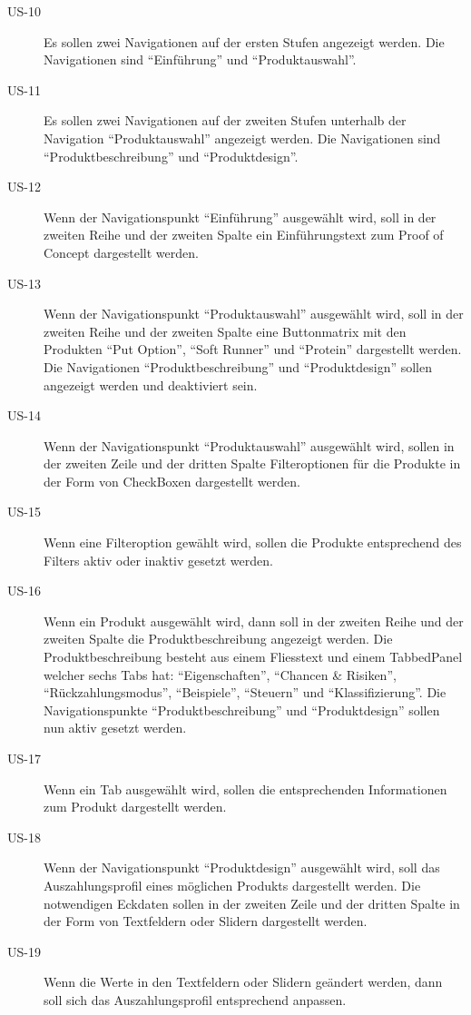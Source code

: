 \begin{description}
\item[US-10\label{itm:US-10}]
Es sollen zwei Navigationen auf der ersten Stufen angezeigt werden. Die
Navigationen sind ``Einführung'' und ``Produktauswahl''.

\item[US-11\label{itm:US-11}]
Es sollen zwei Navigationen auf der zweiten Stufen unterhalb der Navigation
``Produktauswahl'' angezeigt werden. Die Navigationen sind
``Produktbeschreibung'' und ``Produktdesign''.

\item[US-12\label{itm:US-12}]
Wenn der Navigationspunkt ``Einführung'' ausgewählt wird, soll in der zweiten
Reihe und der zweiten Spalte ein Einführungstext zum Proof of Concept
dargestellt werden.

\item[US-13\label{itm:US-13}]
Wenn der Navigationspunkt ``Produktauswahl'' ausgewählt wird, soll in der
zweiten Reihe und der zweiten Spalte eine Buttonmatrix mit den Produkten
``Put Option'', ``Soft Runner'' und ``Protein'' dargestellt werden. Die
Navigationen ``Produktbeschreibung'' und ``Produktdesign'' sollen angezeigt
werden und deaktiviert sein.

\item[US-14\label{itm:US-14}]
Wenn der Navigationspunkt ``Produktauswahl'' ausgewählt wird, sollen in der
zweiten Zeile und der dritten Spalte Filteroptionen für die Produkte in der Form
von CheckBoxen dargestellt werden.

\item[US-15\label{itm:US-15}]
Wenn eine Filteroption gewählt wird, sollen die Produkte entsprechend des
Filters aktiv oder inaktiv gesetzt werden.

\item[US-16\label{itm:US-16}]
Wenn ein Produkt ausgewählt wird, dann soll in der zweiten Reihe und der zweiten
Spalte die Produktbeschreibung angezeigt werden. Die Produktbeschreibung
besteht aus einem Fliesstext und einem TabbedPanel welcher sechs Tabs hat:
``Eigenschaften'', ``Chancen \& Risiken'', ``Rückzahlungsmodus'',
``Beispiele'', ``Steuern'' und ``Klassifizierung''. Die Navigationspunkte
``Produktbeschreibung'' und ``Produktdesign'' sollen nun aktiv gesetzt werden.

\item[US-17\label{itm:US-17}]
Wenn ein Tab ausgewählt wird, sollen die entsprechenden Informationen zum
Produkt dargestellt werden.

\item[US-18\label{itm:US-18}]
Wenn der Navigationspunkt ``Produktdesign'' ausgewählt wird, soll das
Auszahlungsprofil eines möglichen Produkts dargestellt werden. Die notwendigen
Eckdaten sollen in der zweiten Zeile und der dritten Spalte in der Form von
Textfeldern oder Slidern dargestellt werden.

\item[US-19\label{itm:US-19}]
Wenn die Werte in den Textfeldern oder Slidern geändert werden, dann soll sich
das Auszahlungsprofil entsprechend anpassen.
\end{description}

